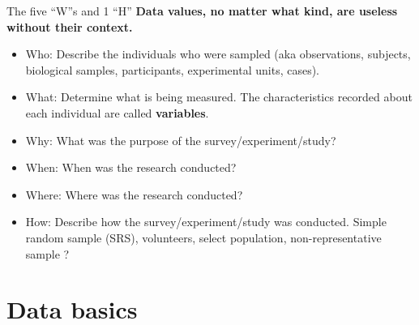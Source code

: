 \documentclass[10pt]{beamer}\usepackage[]{graphicx}\usepackage[]{color}
\begin{document}
\begin{frame}{The five ``W''s and 1 ``H''}
	\textbf{Data values, no matter what kind, are useless without their context.}
	\pause 
	
	\begin{itemize}
		\item \alert{Who:}  Describe the individuals who were sampled (aka observations, subjects, biological samples, participants, experimental units, cases).
		
		\item \alert{What:}  Determine what is being measured. The characteristics recorded about each individual are called \textbf{variables}.
		
		\pause
		
		\item \alert{Why:}  What was the purpose of the survey/experiment/study?
		
		\item \alert{When:}  When was the research conducted?
		
		\item \alert{Where:}  Where was the research conducted?
		
	\pause
		
		\item \alert{How:}  Describe how the survey/experiment/study was conducted. Simple random sample (SRS), volunteers, select population, non-representative sample ?
	\end{itemize}
	
\end{frame}



\section{Data basics}
\end{document}
